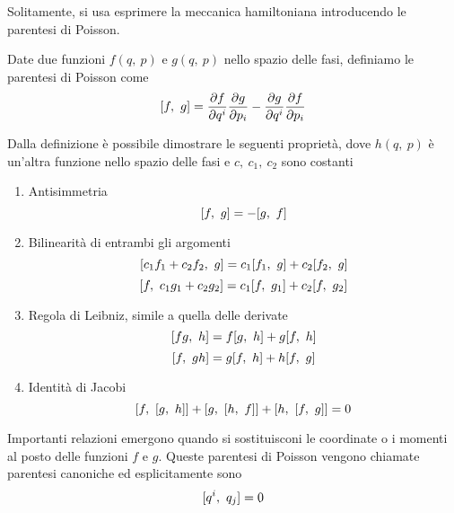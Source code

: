     Solitamente, si usa esprimere la meccanica hamiltoniana introducendo le parentesi di Poisson. 
    \begin{definition}
        Date due funzioni $f(q, ~p)$ e $g(q, ~p)$ nello spazio delle fasi, definiamo le parentesi di Poisson come
    \begin{equation} \label{poisson}
        [f, ~g] = \frac{\partial f}{\partial q^i} \frac{\partial g}{\partial p_i} - \frac{\partial g}{\partial q^i} \frac{\partial f}{\partial p_i}
    \end{equation}
    \end{definition}
    Dalla definizione è possibile dimostrare le seguenti proprietà, dove $h(q, ~p)$ è un'altra funzione nello spazio delle fasi e $c, ~c_1, ~c_2$ sono costanti
    \begin{enumerate}
        \item Antisimmetria
    \begin{equation*}
        [f, ~g] = - [g, ~f]
    \end{equation*}
        \item Bilinearità di entrambi gli argomenti
    \begin{equation*}
        [c_1f_1+c_2f_2, ~g] = c_1 [f_1, ~g] + c_2 [f_2, ~g]
    \end{equation*}
    \begin{equation*}
        [f, ~c_1g_1+c_2g_2] = c_1 [f, ~g_1] + c_2 [f, ~g_2]
    \end{equation*}
        \item Regola di Leibniz, simile a quella delle derivate
    \begin{equation*}
        [fg, ~h] = f [g, ~h] + g [f, ~h]
    \end{equation*}
    \begin{equation*}
        [f, ~gh] = g [f, ~h] + h [f, ~g]
    \end{equation*}
        \item Identità di Jacobi
    \begin{equation} \label{jacobi}
        [f, ~[g, ~h]] + [g, ~[h, ~f]] + [h, ~[f, ~g]] = 0
    \end{equation}
    \end{enumerate}
    Importanti relazioni emergono quando si sostituisconi le coordinate o i momenti al posto delle funzioni $f$ e $g$. Queste parentesi di Poisson vengono chiamate parentesi canoniche ed esplicitamente sono 
    \begin{equation*}
        [q^i, ~q_j] = 0
    \end{equation*}
